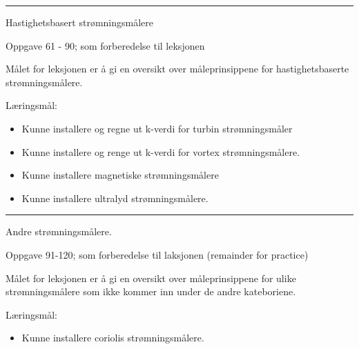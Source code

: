 \filbreak
\hrule \vskip 5pt

\noindent {}

\vskip 5pt



\vskip 2pt  Hastighetsbasert strømningsmålere

\vskip 2pt \noindent Oppgave 61 - 90;  som forberedelse til leksjonen%


Målet for leksjonen er å gi en oversikt over måleprinsippene for hastighetsbaserte strømningsmålere.

	Læringsmål:
	\begin{itemize}[noitemsep]
		\item Kunne installere og regne ut k-verdi for turbin strømningsmåler
		\item Kunne installere og renge ut k-verdi for vortex strømningsmålere. 
		\item Kunne installere magnetiske strømningsmålere
		\item Kunne installere ultralyd strømningsmålere. 
	\end{itemize}

%

\filbreak
\hrule \vskip 5pt
\noindent {} 

\vskip 5pt


\vskip 2pt  Andre strømningsmålere. 

\vskip 2pt \noindent Oppgave 91-120;  som forberedelse til laksjonen (remainder for practice)

\vskip 10pt


Målet for leksjonen er å gi en oversikt over måleprinsippene for ulike strømningsmålere som ikke kommer inn under de andre kateboriene.

	Læringsmål:
	\begin{itemize}[noitemsep]
		\item  Kunne installere coriolis strømningsmålere. 
	\end{itemize}

